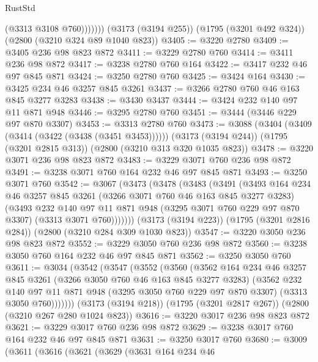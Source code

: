 \begin{lexlean}{RustStd}
\begin{coremodule}
                (@3313 @3108 @760)))))))
    (@3173 (@3194 @255))
    (@1795 (@3201 @492 @324))
    (@2800 (@3210 @324 @89 @1040 @823))
@3405 := @3220 @2780
@3409 := @3405 @236 @98 @823 @872
@3411 := @3229 @2780 @760
@3414 := @3411 @236 @98 @872
@3417 := @3238 @2780 @760 @164
@3422 := @3417 @232 @46 @97 @845 @871
@3424 := @3250 @2780 @760
@3425 := @3424 @164
@3430 := @3425 @234 @46 @3257 @845 @3261
@3437 := @3266 @2780 @760 @46 @163 @845 @3277 @3283
@3438 := @3430 @3437
@3444 := @3424 @232 @140 @97 @11 @871 @948
@3446 := @3295 @2780 @760
@3451 := @3444 (@3446 @229 @97 @870 @3307)
@3453 := @3313 @2780 @760
@3473 := @3088
    (@3404 (@3409 (@3414 (@3422 (@3438 (@3451 @3453))))))
    (@3173 (@3194 @244))
    (@1795 (@3201 @2815 @313))
    (@2800 (@3210 @313 @320 @1035 @823))
@3478 := @3220 @3071 @236 @98 @823 @872
@3483 := @3229 @3071 @760 @236 @98 @872
@3491 := @3238 @3071 @760 @164 @232 @46 @97 @845 @871
@3493 := @3250 @3071 @760
@3542 := @3067
    (@3473
      (@3478
        (@3483
          (@3491
            (@3493
              @164
              @234
              @46
              @3257
              @845
              @3261
              (@3266 @3071 @760 @46 @163 @845 @3277 @3283)
              (@3493
                @232
                @140
                @97
                @11
                @871
                @948
                (@3295 @3071 @760 @229 @97 @870 @3307)
                (@3313 @3071 @760)))))))
    (@3173 (@3194 @223))
    (@1795 (@3201 @2816 @284))
    (@2800 (@3210 @284 @309 @1030 @823))
@3547 := @3220 @3050 @236 @98 @823 @872
@3552 := @3229 @3050 @760 @236 @98 @872
@3560 := @3238 @3050 @760 @164 @232 @46 @97 @845 @871
@3562 := @3250 @3050 @760
@3611 := @3034
    (@3542
      (@3547
        (@3552
          (@3560
            (@3562
              @164
              @234
              @46
              @3257
              @845
              @3261
              (@3266 @3050 @760 @46 @163 @845 @3277 @3283)
              (@3562
                @232
                @140
                @97
                @11
                @871
                @948
                (@3295 @3050 @760 @229 @97 @870 @3307)
                (@3313 @3050 @760)))))))
    (@3173 (@3194 @218))
    (@1795 (@3201 @2817 @267))
    (@2800 (@3210 @267 @280 @1024 @823))
@3616 := @3220 @3017 @236 @98 @823 @872
@3621 := @3229 @3017 @760 @236 @98 @872
@3629 := @3238 @3017 @760 @164 @232 @46 @97 @845 @871
@3631 := @3250 @3017 @760
@3680 := @3009
    (@3611
      (@3616
        (@3621
          (@3629
            (@3631
              @164
              @234
              @46

\end{coremodule}
\end{lexlean}
